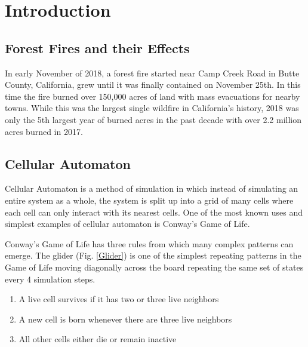 \documentclass[ aps, pra, reprint, notitlepage ]{revtex4-1}
\begin{document}
\section{\label{Intro}Introduction}

\subsection{\label{ForestFires} Forest Fires and their Effects}

In early November of 2018, a forest fire started near Camp Creek Road in Butte County, California, grew until it was finally contained on November 25th. In this time the fire burned over 150,000 acres of land with mass evacuations for nearby towns.\cite{CampFire, CampFireReport} While this was the largest single wildfire in California's history, 2018 was only the 5th largest year of burned acres in the past decade with over 2.2 million acres burned in 2017.\cite{WildFireYear}


\subsection{\label{CellularAutomaton} Cellular Automaton}

Cellular Automaton is a method of simulation in which instead of simulating an entire system as a whole, the system is split up into a grid of many cells where each cell can only interact with its nearest cells. One of the most known uses and simplest examples of cellular automaton is Conway's Game of Life.

Conway's Game of Life has three rules from which many complex patterns can emerge.\cite{ConwayGoL} The glider (Fig. \ref{Glider}) is one of the simplest repeating patterns in the Game of Life moving diagonally across the board repeating the same set of states every 4 simulation steps.
\begin{enumerate}
	\item A live cell survives if it has two or three live neighbors
	\item A new cell is born whenever there are three live neighbors
	\item All other cells either die or remain inactive
\end{enumerate}
\end{document}
